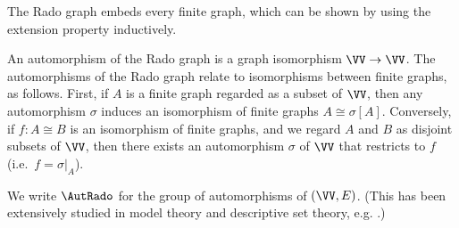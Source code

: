 The Rado graph embeds every finite graph, which can be shown by using
the extension property inductively.

An automorphism of the Rado graph is a graph isomorphism $\VV\to
\VV$. 
The automorphisms of the Rado graph relate to isomorphisms between
finite graphs, as follows. First, if $A$ is a finite graph regarded as
a subset of $\VV$, then any automorphism $\sigma$ induces an
isomorphism of finite graphs $A\cong \sigma[A]$. Conversely,
if $f\colon A\cong B$ is an isomorphism of finite graphs, and we regard $A$
and $B$ as disjoint subsets of $\VV$, then there exists an
automorphism $\sigma$ of $\VV$ that restricts to $f$ (i.e.\ $f=\sigma|_A$).

We write $\AutRado$ for the group of automorphisms of $(\VV,E)$. 
(This has been extensively studied in model theory and descriptive set theory, e.g. \cite{MR2140630,MR3274785}.)

